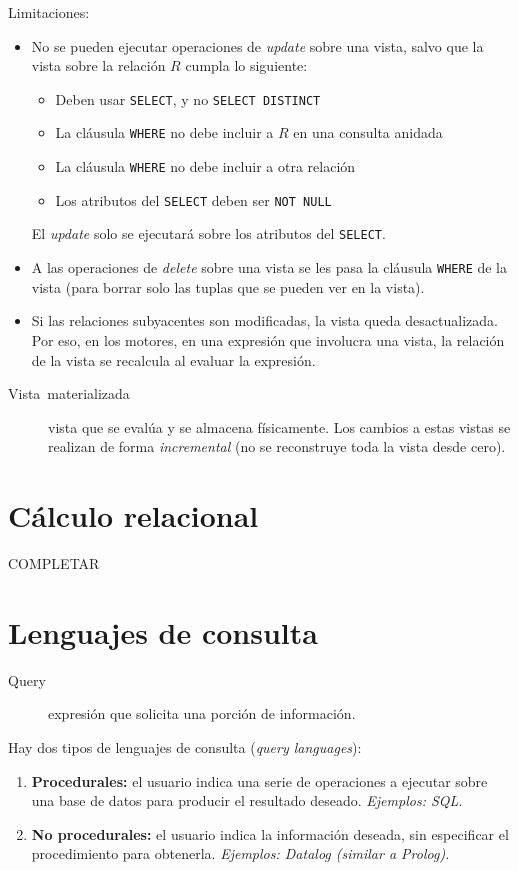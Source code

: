 \documentclass[a4paper, twoside]{article}
\begin{document}
Limitaciones:
\begin{itemize}
\item No se pueden ejecutar operaciones de \emph{update} sobre una vista,
salvo que la vista sobre la relación $R$ cumpla lo siguiente:

\begin{itemize}
\item Deben usar \texttt{SELECT}, y no \texttt{SELECT DISTINCT}
\item La cláusula \texttt{WHERE} no debe incluir a $R$ en una consulta
anidada
\item La cláusula \texttt{WHERE} no debe incluir a otra relación
\item Los atributos del \texttt{SELECT} deben ser \texttt{NOT NULL}
\end{itemize}

El \emph{update} solo se ejecutará sobre los atributos del \texttt{SELECT}.

\item A las operaciones de \emph{delete} sobre una vista se les pasa la
cláusula \texttt{WHERE} de la vista (para borrar solo las tuplas que
se pueden ver en la vista).
\item Si las relaciones subyacentes son modificadas, la vista queda desactualizada.
Por eso, en los motores, en una expresión que involucra una vista,
la relación de la vista se recalcula al evaluar la expresión.\end{itemize}
\begin{description}
\item [{Vista~materializada}] vista que se evalúa y se almacena físicamente.
Los cambios a estas vistas se realizan de forma \emph{incremental
}(no se reconstruye toda la vista desde cero).
\end{description}

\section{Cálculo relacional}

 COMPLETAR


\section{Lenguajes de consulta}
\begin{description}
\item [{Query}] expresión que solicita una porción de información.
\end{description}
Hay dos tipos de lenguajes de consulta (\emph{query languages}):
\begin{enumerate}
\item \textbf{Procedurales:} el usuario indica una serie de operaciones
a ejecutar sobre una base de datos para producir el resultado deseado.
\emph{Ejemplos: SQL.}
\item \textbf{No procedurales:} el usuario indica la información deseada,
sin especificar el procedimiento para obtenerla. \emph{Ejemplos: Datalog
(similar a Prolog).}
\end{enumerate}
\end{document}
